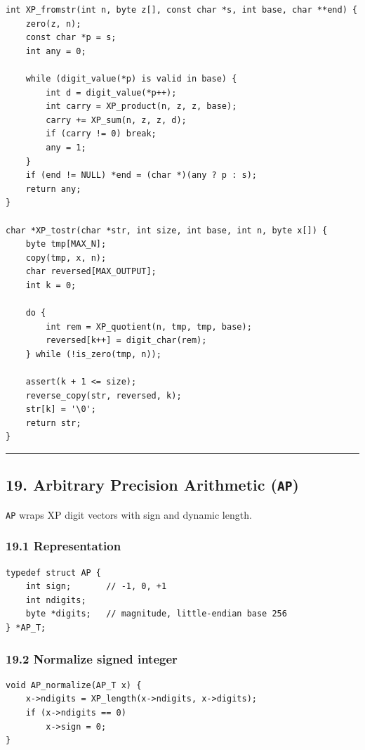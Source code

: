 \documentclass[11pt]{article}
\begin{document}
\begin{verbatim}
int XP_fromstr(int n, byte z[], const char *s, int base, char **end) {
    zero(z, n);
    const char *p = s;
    int any = 0;

    while (digit_value(*p) is valid in base) {
        int d = digit_value(*p++);
        int carry = XP_product(n, z, z, base);
        carry += XP_sum(n, z, z, d);
        if (carry != 0) break;
        any = 1;
    }
    if (end != NULL) *end = (char *)(any ? p : s);
    return any;
}

char *XP_tostr(char *str, int size, int base, int n, byte x[]) {
    byte tmp[MAX_N];
    copy(tmp, x, n);
    char reversed[MAX_OUTPUT];
    int k = 0;

    do {
        int rem = XP_quotient(n, tmp, tmp, base);
        reversed[k++] = digit_char(rem);
    } while (!is_zero(tmp, n));

    assert(k + 1 <= size);
    reverse_copy(str, reversed, k);
    str[k] = '\0';
    return str;
}
\end{verbatim}

\begin{center}\rule{0.5\linewidth}{0.5pt}\end{center}

\subsection{\texorpdfstring{19. Arbitrary Precision Arithmetic (\texttt{AP})}{19. Arbitrary Precision Arithmetic (AP)}}\label{arbitrary-precision-arithmetic-ap}

\texttt{AP} wraps XP digit vectors with sign and dynamic length.

\subsubsection{19.1 Representation}\label{representation-6}

\begin{verbatim}
typedef struct AP {
    int sign;       // -1, 0, +1
    int ndigits;
    byte *digits;   // magnitude, little-endian base 256
} *AP_T;
\end{verbatim}

\subsubsection{19.2 Normalize signed integer}\label{normalize-signed-integer}

\begin{verbatim}
void AP_normalize(AP_T x) {
    x->ndigits = XP_length(x->ndigits, x->digits);
    if (x->ndigits == 0)
        x->sign = 0;
}
\end{verbatim}
\end{document}
